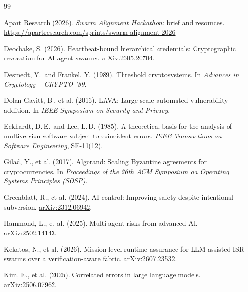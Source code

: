 \documentclass[11pt, letterpaper]{article}
\newcommand{\arxiv}[1]{\href{https://arxiv.org/abs/#1}{arXiv:#1}}
\begin{document}
\begingroup
\setlength{\parskip}{0pt}
\renewcommand{\bibsection}{\section*{References}}
\setlength{\bibsep}{3pt}
\small
\begin{thebibliography}{99}

Apart Research (2026). \emph{Swarm Alignment Hackathon}: brief and resources.
\url{https://apartresearch.com/sprints/swarm-alignment-2026}

Deochake, S. (2026). Heartbeat-bound hierarchical credentials: Cryptographic
revocation for AI agent swarms. \arxiv{2605.20704}.

Desmedt, Y.\ and Frankel, Y. (1989). Threshold cryptosystems. In
\emph{Advances in Cryptology -- CRYPTO '89}.

Dolan-Gavitt, B., et al. (2016). LAVA: Large-scale automated vulnerability
addition. In \emph{IEEE Symposium on Security and Privacy}.

Eckhardt, D.\,E.\ and Lee, L.\,D. (1985). A theoretical basis for the analysis of
multiversion software subject to coincident errors. \emph{IEEE Transactions on
Software Engineering}, SE-11(12).

Gilad, Y., et al. (2017). Algorand: Scaling Byzantine agreements for
cryptocurrencies. In \emph{Proceedings of the 26th ACM Symposium on Operating
Systems Principles (SOSP)}.

Greenblatt, R., et al. (2024). AI control: Improving safety despite intentional
subversion. \arxiv{2312.06942}.

Hammond, L., et al. (2025). Multi-agent risks from advanced AI.
\arxiv{2502.14143}.

Kekatos, N., et al. (2026). Mission-level runtime assurance for LLM-assisted ISR
swarms over a verification-aware fabric. \arxiv{2607.23532}.

Kim, E., et al. (2025). Correlated errors in large language models.
\arxiv{2506.07962}.


\end{thebibliography}
\end{document}
